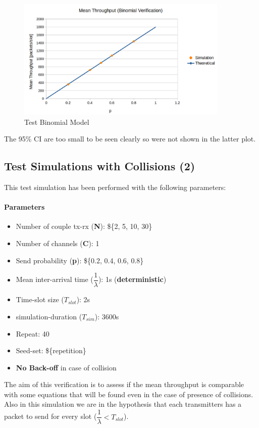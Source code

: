 \begin{figure}[H]
	\centering
	\includegraphics[width=0.9\textwidth]{img/plotTheoreticalMeanBinomial.png}
	\caption{Test Binomial Model}
\end{figure}

The 95\% CI are too small to be seen clearly so were not shown in the latter plot. 

\subsection{Test Simulations with Collisions (2)}
This test simulation has been performed with the following parameters:
\paragraph{Parameters}
\begin{itemize}
	\item Number of couple tx-rx (\textbf{N}): \$\{2, 5, 10, 30\}
	\item Number of channels (\textbf{C}): 1
	\item Send probability (\textbf{p}): \$\{0.2, 0.4, 0.6, 0.8\}
	\item Mean inter-arrival time ($\dfrac{1}{\lambda}$): 1s (\textbf{deterministic}) 
	\item Time-slot size ($T_{slot}$): 2s 
	\item simulation-duration ($T_{sim}$): 3600s 
	\item Repeat: 40
	\item Seed-set: \$\{repetition\}
	\item \textbf{No Back-off} in case of collision
\end{itemize}

\noindent The aim of this verification is to assess if the mean throughput is comparable with some equations that will be found even in the case of presence of collisions. Also in this simulation we are in the hypothesis that each transmitters has a packet to send for every slot ($\dfrac{1}{\lambda} < T_{slot}$).\\


